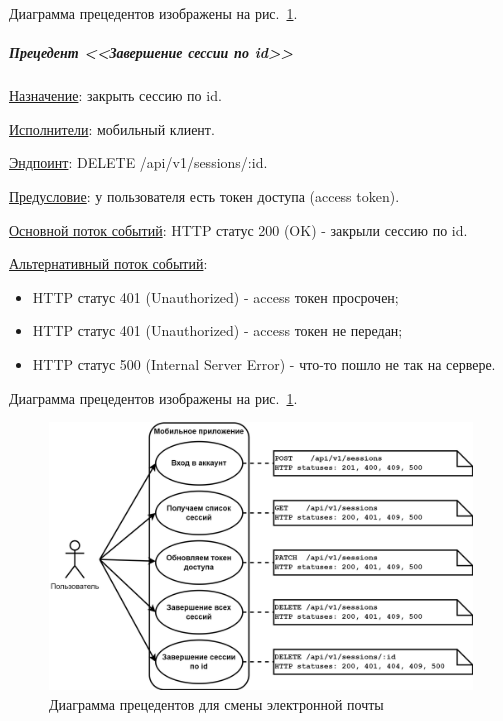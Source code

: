 Диаграмма прецедентов изображены на рис.~\ref{fig:UML_precedent_sessions}.


\subparagraph{Прецедент <<Завершение сессии по id>>} \hspace{0pt}

\underline{Назначение}: закрыть сессию по id.

\underline{Исполнители}: мобильный клиент.

\underline{Эндпоинт}: DELETE /api/v1/sessions/:id.

\underline{Предусловие}: у пользователя есть токен доступа (access token).

\underline{Основной поток событий}: HTTP статус 200 (OK) - закрыли сессию по id. 

\underline{Альтернативный поток событий}:

\begin{itemize}
    \item HTTP статус 401 (Unauthorized) - access токен просрочен;
    \item HTTP статус 401 (Unauthorized) - access токен не передан;
    \item HTTP статус 500 (Internal Server Error) - что-то пошло не так на сервере.
\end{itemize}

Диаграмма прецедентов изображены на рис.~\ref{fig:UML_precedent_sessions}.


\begin{figure}[!htb]
    \centering

    \includegraphics[width=18cm]
    {images/UML/UML_precedent_sessions.png}

    \caption{Диаграмма прецедентов для смены электронной почты}

    \label{fig:UML_precedent_sessions}
\end{figure}

